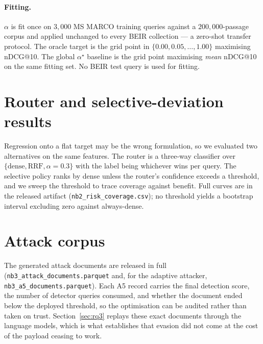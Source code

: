 \documentclass{article}
\begin{document}
\paragraph{Fitting.} $\alpha$ is fit once on $3{,}000$ MS MARCO
\citep{nguyen2016msmarco} training queries
against a $200{,}000$-passage corpus and applied unchanged to every BEIR
collection --- a zero-shot transfer protocol. The oracle target is the grid
point in $\{0.00, 0.05, \ldots, 1.00\}$ maximising nDCG@10. The global
$\alpha^\star$ baseline is the grid point maximising \emph{mean} nDCG@10 on the
same fitting set. No BEIR test query is used for fitting.

\section{Router and selective-deviation results}
\label{app:router}

Regression onto a flat target may be the wrong formulation, so we evaluated two
alternatives on the same features. The router is a three-way classifier over
$\{\text{dense}, \text{RRF}, \alpha{=}0.3\}$ with the label being whichever wins
per query. The selective policy ranks by dense unless the router's confidence
exceeds a threshold, and we sweep the threshold to trace coverage against
benefit. Full curves are in the released artifact
(\texttt{nb2\_risk\_coverage.csv}); no threshold yields a bootstrap interval
excluding zero against always-dense.

\section{Attack corpus}
\label{app:attacks}

The generated attack documents are released in full
(\texttt{nb3\_attack\_documents.parquet} and, for the adaptive attacker,
\texttt{nb3\_a5\_documents.parquet}). Each A5 record carries the final detection
score, the number of detector queries consumed, and whether the document ended
below the deployed threshold, so the optimisation can be audited rather than
taken on trust. Section~\ref{sec:rq3} replays these exact documents through the
language models, which is what establishes that evasion did not come at the cost
of the payload ceasing to work.
\end{document}
